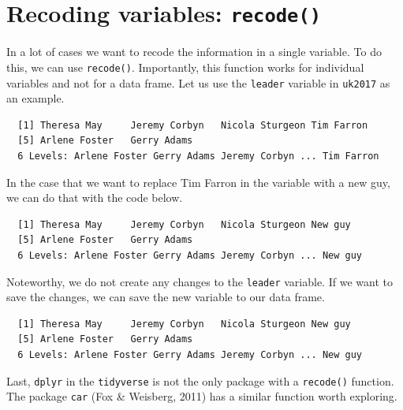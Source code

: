 \documentclass[12pt,oneside]{reedthesis}
\theoremstyle{definition}
\theoremstyle{definition}
\theoremstyle{definition}
\theoremstyle{remark}
\begin{document}
  \section{\texorpdfstring{Recoding variables:
  \texttt{recode()}}{Recoding variables: recode()}}\label{recoding-variables-recode}
  
  In a lot of cases we want to recode the information in a single
  variable. To do this, we can use \texttt{recode()}. Importantly, this
  function works for individual variables and not for a data frame. Let us
  use the \texttt{leader} variable in \texttt{uk2017} as an example.
  \begin{Shaded}
  \begin{Highlighting}[]
  \OperatorTok{$}
  \end{Highlighting}
  \end{Shaded}
  \begin{verbatim}
  [1] Theresa May     Jeremy Corbyn   Nicola Sturgeon Tim Farron     
  [5] Arlene Foster   Gerry Adams    
  6 Levels: Arlene Foster Gerry Adams Jeremy Corbyn ... Tim Farron
  \end{verbatim}
  In the case that we want to replace Tim Farron in the variable with a
  new guy, we can do that with the code below.
  \begin{Shaded}
  \begin{Highlighting}[]
  \OperatorTok{$}\NormalTok{ =}\NormalTok{)}
  \end{Highlighting}
  \end{Shaded}
  \begin{verbatim}
  [1] Theresa May     Jeremy Corbyn   Nicola Sturgeon New guy        
  [5] Arlene Foster   Gerry Adams    
  6 Levels: Arlene Foster Gerry Adams Jeremy Corbyn ... New guy
  \end{verbatim}
  Noteworthy, we do not create any changes to the \texttt{leader}
  variable. If we want to save the changes, we can save the new variable
  to our data frame.
  \begin{Shaded}
  \begin{Highlighting}[]
  \OperatorTok{$}\StringTok{ }\OperatorTok{$}\NormalTok{ =}\NormalTok{)}
  
  \OperatorTok{$}
  \end{Highlighting}
  \end{Shaded}
  \begin{verbatim}
  [1] Theresa May     Jeremy Corbyn   Nicola Sturgeon New guy        
  [5] Arlene Foster   Gerry Adams    
  6 Levels: Arlene Foster Gerry Adams Jeremy Corbyn ... New guy
  \end{verbatim}
  Last, \texttt{dplyr} in the \texttt{tidyverse} is not the only package
  with a \texttt{recode()} function. The package \texttt{car} (Fox \&
  Weisberg, 2011) has a similar function worth exploring.
  
\end{document}
